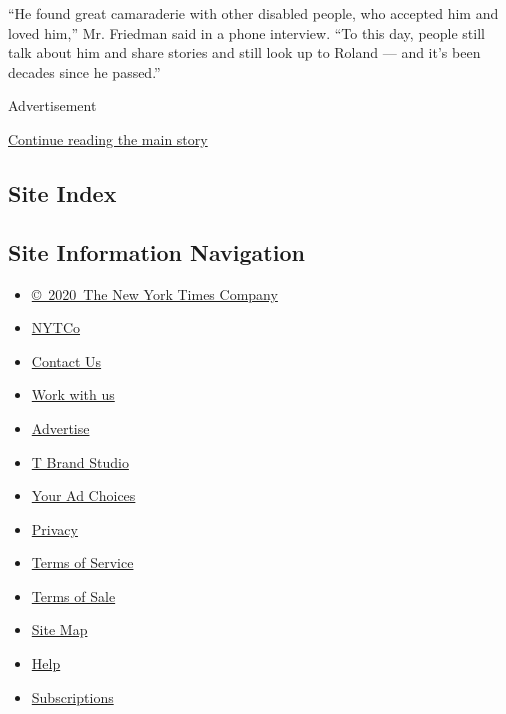 ``He found great camaraderie with other disabled people, who accepted
him and loved him,'' Mr. Friedman said in a phone interview. ``To this
day, people still talk about him and share stories and still look up to
Roland --- and it's been decades since he passed.''

Advertisement

\protect\hyperlink{after-bottom}{Continue reading the main story}

\hypertarget{site-index}{%
\subsection{Site Index}\label{site-index}}

\hypertarget{site-information-navigation}{%
\subsection{Site Information
Navigation}\label{site-information-navigation}}

\begin{itemize}
\tightlist
\item
  \href{https://help.nytimes3xbfgragh.onion/hc/en-us/articles/115014792127-Copyright-notice}{©~2020~The
  New York Times Company}
\end{itemize}

\begin{itemize}
\tightlist
\item
  \href{https://www.nytco.com/}{NYTCo}
\item
  \href{https://help.nytimes3xbfgragh.onion/hc/en-us/articles/115015385887-Contact-Us}{Contact
  Us}
\item
  \href{https://www.nytco.com/careers/}{Work with us}
\item
  \href{https://nytmediakit.com/}{Advertise}
\item
  \href{http://www.tbrandstudio.com/}{T Brand Studio}
\item
  \href{https://www.nytimes3xbfgragh.onion/privacy/cookie-policy\#how-do-i-manage-trackers}{Your
  Ad Choices}
\item
  \href{https://www.nytimes3xbfgragh.onion/privacy}{Privacy}
\item
  \href{https://help.nytimes3xbfgragh.onion/hc/en-us/articles/115014893428-Terms-of-service}{Terms
  of Service}
\item
  \href{https://help.nytimes3xbfgragh.onion/hc/en-us/articles/115014893968-Terms-of-sale}{Terms
  of Sale}
\item
  \href{https://spiderbites.nytimes3xbfgragh.onion}{Site Map}
\item
  \href{https://help.nytimes3xbfgragh.onion/hc/en-us}{Help}
\item
  \href{https://www.nytimes3xbfgragh.onion/subscription?campaignId=37WXW}{Subscriptions}
\end{itemize}
